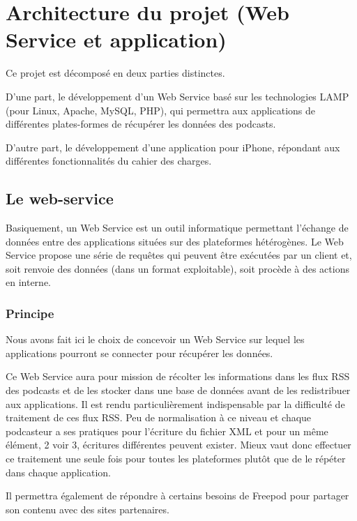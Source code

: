 \documentclass[11pt, french]{report}
\begin{document}
\section{Architecture du projet (Web Service et application)}
Ce projet est décomposé en deux parties distinctes. 

D’une part, le développement d’un Web Service basé sur les technologies LAMP (pour Linux, Apache, MySQL, PHP), qui permettra aux applications de différentes plates-formes de récupérer les données des podcasts. 

D'autre part, le développement d'une application pour iPhone, répondant aux différentes fonctionnalités du cahier des charges.

\subsection{Le web-service}

Basiquement, un Web Service est un outil informatique permettant l'échange de données entre des applications situées sur des plateformes hétérogènes. Le Web Service propose une série de requêtes qui peuvent être exécutées par un client et, soit renvoie des données (dans un format exploitable), soit procède à des actions en interne.

\subsubsection{Principe}

Nous avons fait ici le choix de concevoir un Web Service sur lequel les applications pourront se connecter pour récupérer les données. 

Ce Web Service aura pour mission de récolter les informations dans les flux RSS des podcasts et de les stocker dans une base de données avant de les redistribuer aux applications. Il est rendu particulièrement indispensable par la difficulté de traitement de ces flux RSS. Peu de normalisation à ce niveau et chaque podcasteur a ses pratiques pour l'écriture du fichier XML et pour un même élément, 2 voir 3, écritures différentes peuvent exister. Mieux vaut donc effectuer ce traitement une seule fois pour toutes les plateformes plutôt que de le répéter dans chaque application.

Il permettra également de répondre à certains besoins de Freepod pour partager son contenu avec des sites partenaires.
\end{document}
